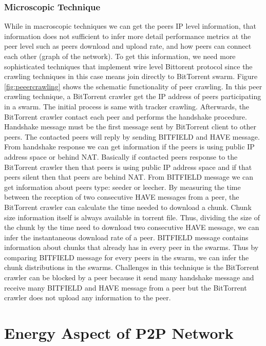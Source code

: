 \subsubsection{Microscopic Technique}
While in macroscopic techniques we can get the peers IP level information, that information does not sufficient to infer more detail performance metrics at the peer level such as peers download and upload rate, and how peers can connect each other (graph of the network).
To get this information, we need more sophisticated techniques that implement wire level Bittorent protocol since the crawling techniques in this case means join directly to BitTorrent swarm.
Figure \ref{fig:peeercrawling} shows the schematic functionality of peer crawling.  
In this peer crawling technique, a BitTorrent crawler get the IP address of peers participating in a swarm.
The initial process is same with tracker crawling. 
Afterwards, the BitTorrent crawler contact each peer and performs the handshake procedure. 
Handshake message must be the first message sent by BitTorrent client to other peers.
The contacted peers will reply by sending BITFIELD and HAVE message.
From handshake response we can get information if the peers is using public IP address space or behind NAT. 
Basically if contacted peers response to the BitTorrent crawler then that peers is using public IP address space and if that peers silent then that peers are behind NAT.
From BITFIELD message we can get information about peers type: seeder or leecher.   
By measuring the time between the reception of two consecutive HAVE messages from a peer, the BitTorrent crawler can calculate the time needed to download a chunk.
Chunk size information itself is always available in torrent file.
Thus, dividing the size of the chunk by the time need to download two consecutive HAVE message, we can infer the instantaneous download rate of a peer.
BITFIELD message contains information about chunks that already has in every peer in the swarms.  
Thus by comparing BITFIELD message for every peers in the swarm,  we can infer the chunk distributions in the swarms.
Challenges in this technique is the BitTorrent crawler can be blocked by a peer because it send many handshake message and receive many BITFIELD and HAVE message from a peer but the BitTorrent crawler does not upload any information to the peer.


\section{Energy Aspect of P2P Network}

